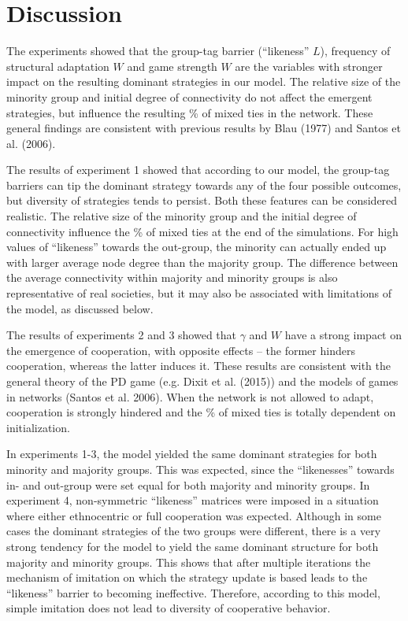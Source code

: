 \section{Discussion}
The experiments showed that the group-tag barrier (``likeness'' $ L $), frequency of structural adaptation $ W $ and game strength $ W $ are the variables with stronger impact on the resulting dominant strategies in our model. The relative size of the minority group and initial degree of connectivity do not affect the emergent strategies, but influence the resulting \% of mixed ties in the network. These general findings are consistent with previous results by Blau (1977) and Santos et al. (2006).

The results of experiment 1 showed that according to our model, the group-tag barriers can tip the dominant strategy towards any of the four possible outcomes, but diversity of strategies tends to persist. Both these features can be considered realistic. The relative size of the minority group and the initial degree of connectivity influence the \% of mixed ties at the end of the simulations. For high values of ``likeness'' towards the out-group, the minority can actually ended up with larger average node degree than the majority group. The difference between the average connectivity within majority and minority groups is also representative of real societies, but it may also be associated with limitations of the model, as discussed below.

The results of experiments 2 and 3 showed that $ \gamma $ and $ W $ have a strong impact on the emergence of cooperation, with opposite effects -- the former hinders cooperation, whereas the latter induces it. These results are consistent with the general theory of the PD game (e.g. Dixit et al. (2015)) and the models of games in networks (Santos et al. 2006). When the network is not allowed to adapt, cooperation is strongly hindered and the \% of mixed ties is totally dependent on initialization.

In experiments 1-3, the model yielded the same dominant strategies for both minority and majority groups. This was expected, since the ``likenesses'' towards in- and out-group were set equal for both majority and minority groups. In experiment 4, non-symmetric ``likeness'' matrices were imposed in a situation where either ethnocentric or full cooperation was expected. Although in some cases the dominant strategies of the two groups were different, there is a very strong tendency for the model to yield the same dominant structure for both majority and minority groups. This shows that after multiple iterations the mechanism of imitation on which the strategy update is based leads to the ``likeness'' barrier to becoming ineffective. Therefore, according to this model, simple imitation does not lead to diversity of cooperative behavior.



